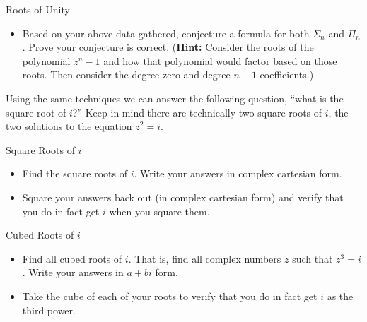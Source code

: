 \begin{exercise}{Roots of Unity \Coffeecup \Coffeecup \Coffeecup \Coffeecup}
\begin{itemize}
where $\Sigma_n$ represents the sum of all $n^{th}$ roots of unity and $\Pi_n$ represents the product of all $n^{th}$ roots of unity.  ({\bf Hint:} It's easier to add in cartesian, and easier to multiply in polar.)

\item Based on your above data gathered, conjecture a formula for both $\Sigma_n$  and $\Pi_n$.  Prove your conjecture is correct.  ({\bf Hint:} Consider the roots of the polynomial $z^n-1$ and how that polynomial would factor based on those roots.  Then consider the degree zero and degree $n-1$ coefficients.)

\vspace*{2in}

\end{itemize}
\end{exercise}

Using the same techniques we can answer the following question, ``what is the square root of $i$?''  Keep in mind there are technically two square roots of $i$, the two solutions to the equation $z^2=i$.

\begin{exercise}{Square Roots of $i$ \Coffeecup \Coffeecup}
\begin{itemize}

\item Find the square roots of $i$.  Write your answers in complex cartesian form.

\vspace*{2in}

\item Square your answers back out (in complex cartesian form) and verify that you do in fact get $i$ when you square them.

\vspace*{2in}

\end{itemize}
\end{exercise}

\begin{exercise}{Cubed Roots of $i$ \Coffeecup \Coffeecup \Coffeecup}
\begin{itemize}

\item Find all cubed roots of $i$.  That is, find all complex numbers $z$ such that $z^3=i$.  Write your answers in $a+bi$ form. 

\vspace*{2in}

\item Take the cube of each of your roots to verify that you do in fact get $i$ as the third power.

\vspace*{2in}

\end{itemize}
\end{exercise}


